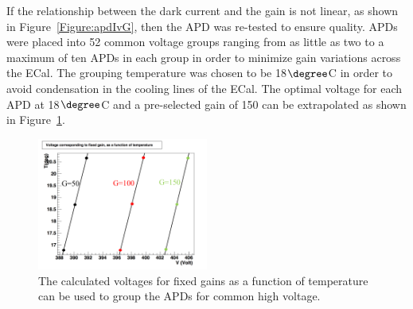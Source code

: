 If the relationship between the dark current and the gain is not linear, as shown in Figure~\ref{Figure:apdIvG}, then the APD was re-tested to ensure quality. APDs were placed into 52 common voltage groups ranging from as little as two to a maximum of ten APDs in each group in order to minimize gain variations across the ECal. The grouping temperature was chosen to be 18$\degree$C in order to avoid condensation in the cooling lines of the ECal. The optimal voltage for each APD at 18$\degree$C and a pre-selected gain of 150 can be extrapolated as shown in Figure~\ref{Figure:apdTV}.

\begin{figure}[h]
  \centering
      \includegraphics[width=0.5\textwidth]{pics/experiment/apdTV.png}
  \caption[APD fixed gain in terms of voltage and temperature]{The calculated voltages for fixed gains as a function of temperature can be used to group the APDs for common high voltage.}
  \label{Figure:apdTV}
\end{figure}

